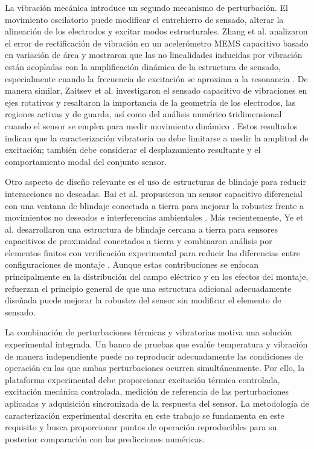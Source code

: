 \documentclass[conference]{IEEEtran}
\begin{document}
La vibración mecánica introduce un segundo mecanismo de perturbación. El movimiento oscilatorio puede modificar el entrehierro de sensado, alterar la alineación de los electrodos y excitar modos estructurales. Zhang et al. analizaron el error de rectificación de vibración en un acelerómetro MEMS capacitivo basado en variación de área y mostraron que las no linealidades inducidas por vibración están acopladas con la amplificación dinámica de la estructura de sensado, especialmente cuando la frecuencia de excitación se aproxima a la resonancia \cite{Zhang2024}. De manera similar, Zaitsev et al. investigaron el sensado capacitivo de vibraciones en ejes rotativos y resaltaron la importancia de la geometría de los electrodos, las regiones activas y de guarda, así como del análisis numérico tridimensional cuando el sensor se emplea para medir movimiento dinámico \cite{Zaitsev2022}. Estos resultados indican que la caracterización vibratoria no debe limitarse a medir la amplitud de excitación; también debe considerar el desplazamiento resultante y el comportamiento modal del conjunto sensor.

Otro aspecto de diseño relevante es el uso de estructuras de blindaje para reducir interacciones no deseadas. Bai et al. propusieron un sensor capacitivo diferencial con una ventana de blindaje conectada a tierra para mejorar la robustez frente a movimientos no deseados e interferencias ambientales \cite{Bai2016}. Más recientemente, Ye et al. desarrollaron una estructura de blindaje cercana a tierra para sensores capacitivos de proximidad conectados a tierra y combinaron análisis por elementos finitos con verificación experimental para reducir las diferencias entre configuraciones de montaje \cite{Ye2025}. Aunque estas contribuciones se enfocan principalmente en la distribución del campo eléctrico y en los efectos del montaje, refuerzan el principio general de que una estructura adicional adecuadamente diseñada puede mejorar la robustez del sensor sin modificar el elemento de sensado.

La combinación de perturbaciones térmicas y vibratorias motiva una solución experimental integrada. Un banco de pruebas que evalúe temperatura y vibración de manera independiente puede no reproducir adecuadamente las condiciones de operación en las que ambas perturbaciones ocurren simultáneamente. Por ello, la plataforma experimental debe proporcionar excitación térmica controlada, excitación mecánica controlada, medición de referencia de las perturbaciones aplicadas y adquisición sincronizada de la respuesta del sensor. La metodología de caracterización experimental descrita en este trabajo se fundamenta en este requisito y busca proporcionar puntos de operación reproducibles para su posterior comparación con las predicciones numéricas.
\end{document}
